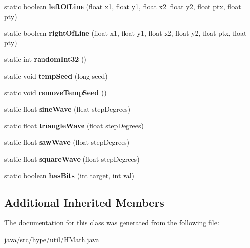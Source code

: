 \begin{DoxyCompactItemize}
\item 
\hypertarget{classhype_1_1util_1_1_h_math_a1f06cdcb07fb30b543b7ac1cfbff615c}{static boolean {\bfseries left\-Of\-Line} (float x1, float y1, float x2, float y2, float ptx, float pty)}\label{classhype_1_1util_1_1_h_math_a1f06cdcb07fb30b543b7ac1cfbff615c}

\item 
\hypertarget{classhype_1_1util_1_1_h_math_aed97b073b226899b8c8750cf58a282ca}{static boolean {\bfseries right\-Of\-Line} (float x1, float y1, float x2, float y2, float ptx, float pty)}\label{classhype_1_1util_1_1_h_math_aed97b073b226899b8c8750cf58a282ca}

\item 
\hypertarget{classhype_1_1util_1_1_h_math_a0bbeefb9f57d4341c5059687ad528682}{static int {\bfseries random\-Int32} ()}\label{classhype_1_1util_1_1_h_math_a0bbeefb9f57d4341c5059687ad528682}

\item 
\hypertarget{classhype_1_1util_1_1_h_math_aaa0f2ca11fbdaaa363c5c29ff1acf58b}{static void {\bfseries temp\-Seed} (long seed)}\label{classhype_1_1util_1_1_h_math_aaa0f2ca11fbdaaa363c5c29ff1acf58b}

\item 
\hypertarget{classhype_1_1util_1_1_h_math_a6209cbef5f9754065c2a7cdc38b43665}{static void {\bfseries remove\-Temp\-Seed} ()}\label{classhype_1_1util_1_1_h_math_a6209cbef5f9754065c2a7cdc38b43665}

\item 
\hypertarget{classhype_1_1util_1_1_h_math_a70432ca80abf61919404cd778100304a}{static float {\bfseries sine\-Wave} (float step\-Degrees)}\label{classhype_1_1util_1_1_h_math_a70432ca80abf61919404cd778100304a}

\item 
\hypertarget{classhype_1_1util_1_1_h_math_ad485c46a803bce9ecb67ffbc995e027a}{static float {\bfseries triangle\-Wave} (float step\-Degrees)}\label{classhype_1_1util_1_1_h_math_ad485c46a803bce9ecb67ffbc995e027a}

\item 
\hypertarget{classhype_1_1util_1_1_h_math_ae2cbf7905c5ec87a10ea532f2164f861}{static float {\bfseries saw\-Wave} (float step\-Degrees)}\label{classhype_1_1util_1_1_h_math_ae2cbf7905c5ec87a10ea532f2164f861}

\item 
\hypertarget{classhype_1_1util_1_1_h_math_a8fd18e82bb54ba01f12b3b87d329ec5f}{static float {\bfseries square\-Wave} (float step\-Degrees)}\label{classhype_1_1util_1_1_h_math_a8fd18e82bb54ba01f12b3b87d329ec5f}

\item 
\hypertarget{classhype_1_1util_1_1_h_math_af99cc1d7b58081d9f54187f49bfca833}{static boolean {\bfseries has\-Bits} (int target, int val)}\label{classhype_1_1util_1_1_h_math_af99cc1d7b58081d9f54187f49bfca833}

\end{DoxyCompactItemize}
\subsection*{Additional Inherited Members}


The documentation for this class was generated from the following file\-:\begin{DoxyCompactItemize}
\item 
java/src/hype/util/H\-Math.\-java\end{DoxyCompactItemize}
